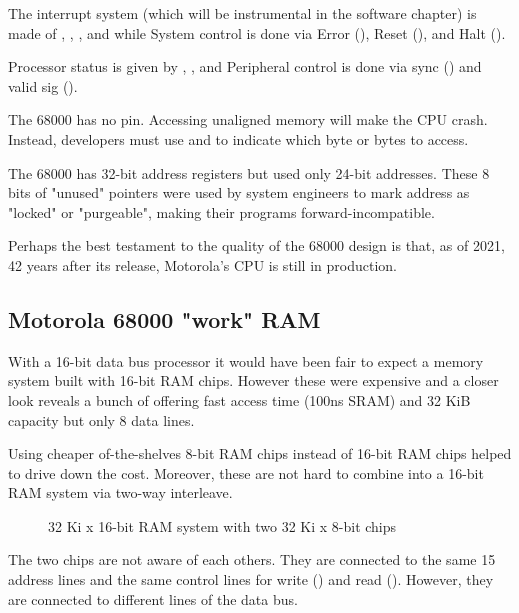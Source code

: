 The interrupt system (which will be instrumental in the software chapter) is made of , , , and  while System control is done via Error (), Reset (), and Halt ().

Processor status is given by , ,  and Peripheral control is done via sync () and valid sig ().


\begin{trivia}
 The 68000 has no  pin. Accessing unaligned memory will make the CPU crash. Instead, developers must use  and  to indicate which byte or bytes to access.
\end{trivia}

\begin{trivia}
 The 68000 has 32-bit address registers but used only 24-bit addresses. These 8 bits of "unused" pointers were used by system engineers to mark address as "locked" or "purgeable", making their programs forward-incompatible. 
\end{trivia}

Perhaps the best testament to the quality of the 68000 design is that, as of 2021, 42 years after its release, Motorola's CPU is still in production.


\subsection{Motorola 68000 "work" RAM}
With a 16-bit data bus processor it would have been fair to expect a memory system built with 16-bit RAM chips. However these were expensive and a closer look reveals a bunch of  offering fast access time (100ns SRAM) and 32 KiB capacity but only 8 data lines.

\pagebreak

Using cheaper of-the-shelves 8-bit RAM chips instead of 16-bit RAM chips helped to drive down the cost. Moreover, these are not hard to combine into a 16-bit RAM system via two-way interleave.

\begin{figure}[H]
\caption*{32 Ki x 16-bit RAM system with two 32 Ki x 8-bit chips}
\end{figure}

The two chips are not aware of each others. They are connected to the same 15 address lines and the same control lines for write () and read (). However, they are connected to different lines of the data bus. 

